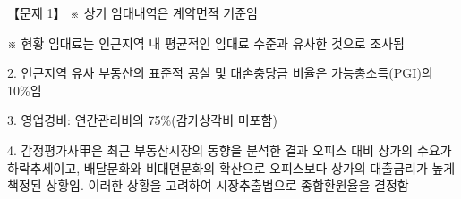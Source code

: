 \begin{longquestion}{【문제 1】}
※ 상기 임대내역은 계약면적 기준임 \par
※ 현황 임대료는 인근지역 내 평균적인 임대료 수준과 유사한 것으로 조사됨 \par
2. 인근지역 유사 부동산의 표준적 공실 및 대손충당금 비율은 가능총소득(PGI)의 10\%임 \par
3. 영업경비: 연간관리비의 75\%(감가상각비 미포함) \par
4. 감정평가사甲은 최근 부동산시장의 동향을 분석한 결과 오피스 대비 상가의 수요가 하락추세이고, 배달문화와 비대면문화의 확산으로 오피스보다 상가의 대출금리가 높게 책정된 상황임. 이러한 상황을 고려하여 시장추출법으로 종합환원율을 결정함 \par
{\small\centering\renewcommand{\arraystretch}{1.25}
\par}


\end{longquestion}

